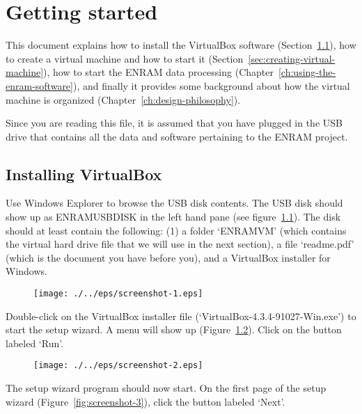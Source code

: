 \chapter{Getting started}

This document explains how to install the VirtualBox software (Section~\ref{sec:installing-virtualbox}), how to create a virtual machine and how to start it (Section~\ref{sec:creating-virtual-machine}), how to start the ENRAM data processing (Chapter~\ref{ch:using-the-enram-software}), and finally it provides some background about how the virtual machine is organized (Chapter~\ref{ch:design-philosophy}).

Since you are reading this file, it is assumed that you have plugged in the USB drive that contains all the data and software pertaining to the ENRAM project.

\clearpage

\section{Installing VirtualBox}
\label{sec:installing-virtualbox}

Use Windows Explorer to browse the USB disk contents. The USB disk should show up as ENRAMUSBDISK in the left hand pane (see figure~\ref{fig:screenshot-1}). The disk should at least contain the following: (1) a folder `ENRAMVM' (which contains the virtual hard drive file that we will use in the next section), a file `readme.pdf' (which is the document you have before you), and a VirtualBox installer for Windows.

\begin{figure}[ht]
  \centering
    \texttt{[image: ./../eps/screenshot-1.eps]}
  \caption{}
  \label{fig:screenshot-1}
\end{figure}


Double-click on the VirtualBox installer file (`VirtualBox-4.3.4-91027-Win.exe') to start the setup wizard. A menu will show up (Figure~\ref{fig:screenshot-2}). Click on the button labeled `Run'.

\begin{figure}[ht]
  \centering
    \texttt{[image: ./../eps/screenshot-2.eps]}
  \caption{}
  \label{fig:screenshot-2}
\end{figure}
\clearpage


The setup wizard program should now start. On the first page of the setup wizard (Figure~\ref{fig:screenshot-3}), click the button labeled `Next'.

